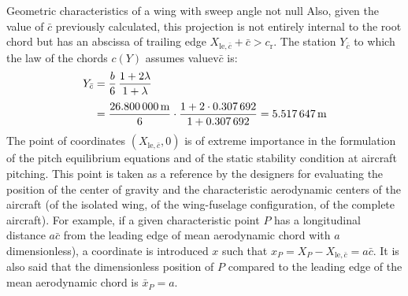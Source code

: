 \documentclass[[12pt,twoside]{book}
\begin{document}
\begin{myExampleX}{Geometric characteristics of a wing with sweep angle not null}{}
Also, given the value of $\bar{c}$ previously calculated, this projection
is not entirely internal to the root chord but has an abscissa of trailing edge $X_{\mathrm{le},\bar{c}}+\bar{c}>c_\mathrm{r}$.
The station $Y_{\bar{c}}$ to which the law of the chords $c(Y)$ assumes valuev$\bar{c}$ is:
\[
\begin{split}
Y_{\bar{c}} 
  & {}=
    \frac{b}{6} \, \frac{1+2\lambda}{1+\lambda} \\[3pt]
  & {}=
    \frac{\SI[round-precision=1]{\mySpanWingMT}{\metre}}{6}
      \cdot 
      \frac{
        1 + 2\cdot\SI[round-precision=2]{\myTaperRatioWing}{}
      }{
        1 + \SI[round-precision=2]{\myTaperRatioWing}{}
      }
    =  \SI[round-precision=2]{\myYMACWingMT}{\metre} 
\end{split}
\]
The point of coordinates $(X_{\mathrm{le},\bar{c}},0)$ is of extreme importance in the formulation of the pitch equilibrium equations and of the static stability condition at aircraft pitching. This point is taken as a reference by the designers for evaluating the position of the center of gravity and the characteristic aerodynamic centers of the aircraft
(of the isolated wing, of the wing-fuselage configuration, of the complete aircraft). For example, if a given characteristic point $P$ has a longitudinal distance $a\bar{c}$ from the leading edge of mean aerodynamic chord with $a$ dimensionless), a coordinate is introduced $x$ such that $x_P = X_P - X_{\mathrm{le},\bar{c}} = a\bar{c}$. It is also said that the dimensionless position of $P$ compared to the leading edge of the mean
aerodynamic chord is $\bar{x}_P=a$.
\end{myExampleX}
\end{document}
